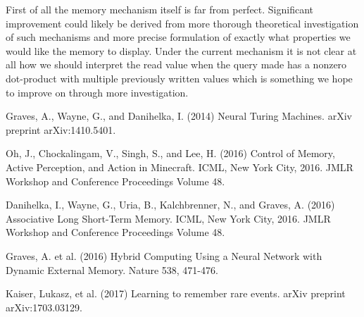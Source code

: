\documentclass{article}
\begin{document}
First of all the memory mechanism itself is far from perfect. Significant improvement could likely be derived from more thorough theoretical investigation of such mechanisms and more precise formulation of exactly what properties we would like the memory to display. Under the current mechanism it is not clear at all how we should interpret the read value when the query made has a nonzero dot-product with multiple previously written values which is something we hope to improve on through more investigation.




\begin{thebibliography}{plain}
Graves, A., Wayne, G., and Danihelka, I. (2014) Neural Turing Machines. arXiv preprint arXiv:1410.5401.

Oh, J., Chockalingam, V., Singh, S., and Lee, H. (2016) Control of Memory, Active Perception, and Action in Minecraft. ICML, New York City, 2016. JMLR Workshop and Conference Proceedings Volume 48.

Danihelka, I., Wayne, G., Uria, B., Kalchbrenner, N., and Graves, A. (2016) Associative Long Short-Term Memory. ICML, New York City, 2016. JMLR Workshop and Conference Proceedings Volume 48.

Graves, A. et al. (2016) Hybrid Computing Using a Neural Network with Dynamic External Memory. Nature 538, 471-476.

Kaiser, Lukasz, et al. (2017) Learning to remember rare events. arXiv preprint arXiv:1703.03129.
\end{thebibliography}
\end{document}
